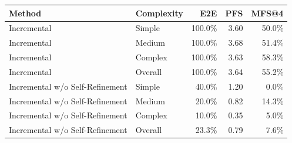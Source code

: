 \begin{tabular}{llrrr}
\toprule
Method & Complexity & E2E & PFS & MFS@4 \\
\midrule
Incremental & Simple & 100.0\% & 3.60 & 50.0\% \\
Incremental & Medium & 100.0\% & 3.68 & 51.4\% \\
Incremental & Complex & 100.0\% & 3.63 & 58.3\% \\
Incremental & Overall & 100.0\% & 3.64 & 55.2\% \\
Incremental w/o Self-Refinement & Simple & 40.0\% & 1.20 & 0.0\% \\
Incremental w/o Self-Refinement & Medium & 20.0\% & 0.82 & 14.3\% \\
Incremental w/o Self-Refinement & Complex & 10.0\% & 0.35 & 5.0\% \\
Incremental w/o Self-Refinement & Overall & 23.3\% & 0.79 & 7.6\% \\
\bottomrule
\end{tabular}
